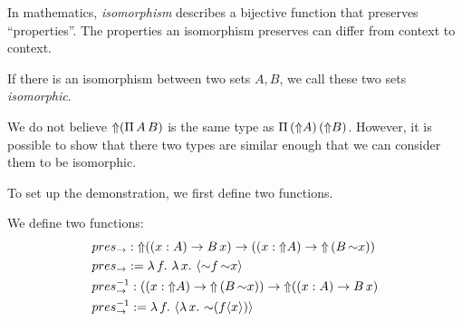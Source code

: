 In mathematics, \emph{isomorphism} describes a bijective function that preserves ``properties''. The properties an isomorphism preserves can differ from context to context. 




\begin{definition}[Isomorphic]
    If there is an isomorphism between two sets $A, B$, we call these two sets \emph{isomorphic}.
\end{definition}

We do not believe ${\Uparrow} (\Pi\,A\,B)$ is the same type as $\Pi\,({\Uparrow} A)\,({\Uparrow} B)$. However, it is possible to show that there two types are similar enough that we can consider them to be isomorphic. 


To set up the demonstration, we first define two functions.

\begin{definition} We define two functions:
    \begin{align*}
        &pres_\to: {\Uparrow}((x : A) \to B\,x) \to ((x : {\Uparrow} A) \to {\Uparrow}\,(B\,{\sim} x)) \\
        &pres_\to := \lambda\,f.\,\,\lambda\,x.\,\,\langle {\sim} f\,{\sim} x\rangle\\
        &pres_\to^{-1}: ((x : {\Uparrow} A) \to {\Uparrow}\,(B\,{\sim} x)) \to {\Uparrow}((x : A) \to B\,x)\\
        &pres_\to^{-1} := \lambda\,f.\,\,\langle \lambda\,x.\,\,{\sim}(f \langle x\rangle)\rangle
    \end{align*}
\end{definition}

